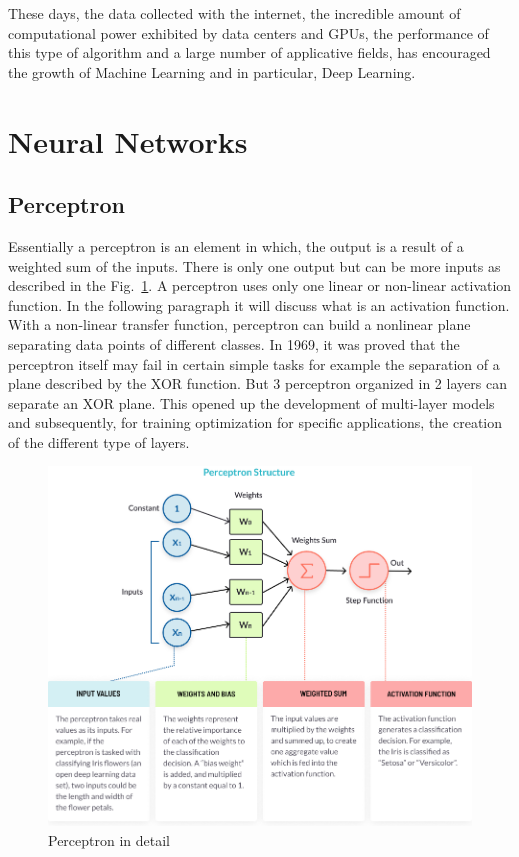 \documentclass[12pt]{report}
\begin{document}
These days, the data collected with the internet, the incredible amount of computational power exhibited
by data centers and GPUs, the performance of this type of algorithm and a large number of applicative fields,
has encouraged the growth of Machine Learning and in particular, Deep Learning. 


\section{Neural Networks}

\subsection{Perceptron}

Essentially a perceptron is an element in which, the output is a result of a weighted sum
of the inputs. There is only one output but can be more inputs as described in the Fig.~\ref{fig:perceptron}. 
A perceptron uses only one linear or non-linear activation function. In the following paragraph it will discuss what is an activation function.
With a non-linear transfer function, perceptron can build a nonlinear plane separating data points of different classes.
In 1969, it was proved that the perceptron itself may fail in certain simple tasks for example
the separation of a plane described by the XOR function. 
But 3 perceptron organized in 2 layers can separate an XOR plane.
This opened up the development of multi-layer models and subsequently, for training optimization for specific
applications, the creation of the different type of layers.

\begin{figure}[t]
    \centering
    \includegraphics[width=\textwidth]{perceptron-structure.png}
    \caption{Perceptron in detail \cite{percepimage}}
    \label{fig:perceptron}
\end{figure}
\end{document}
